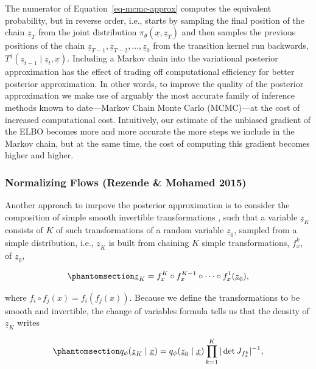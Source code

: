 \documentclass[
]{scrartcl}
\begin{document}
\begin{refsection}
The numerator of Equation~\ref{eq-mcmc-approx} computes the equivalent
probability, but in reverse order, i.e., starts by sampling the final
position of the chain \(\underline{z}_T\) from the joint distribution
\(π_\theta(\underline{x},
\underline{z}_T)\) and then samples the previous positions of the chain
\(\underline{z}_{T-1}, \underline{z}_{T-2}, \ldots, \underline{z}_0\)
from the transition kernel run backwards,
\(T^\dagger(\underline{z}_{t-1} \mid
\underline{z}_{t}, \underline{x})\). Including a Markov chain into the
variational posterior approximation has the effect of trading off
computational efficiency for better posterior approximation. In other
words, to improve the quality of the posterior approximation we make use
of arguably the most accurate family of inference methods known to
date---Markov Chain Monte Carlo (MCMC)---at the cost of increased
computational cost. Intuitively, our estimate of the unbiased gradient
of the ELBO becomes more and more accurate the more steps we include in
the Markov chain, but at the same time, the cost of computing this
gradient becomes higher and higher.

\subsubsection{Normalizing Flows (Rezende \& Mohamed
2015)}\label{sec-normalizing-flows}

Another approach to imrpove the posterior approximation is to consider
the composition of simple smooth invertible transformations
\autocite{rezende2016}, such that a variable \(\underline{z}_K\)
consists of \(K\) of such transformations of a random variable
\(\underline{z}_0\), sampled from a simple distribution, i.e.,
\(\underline{z}_K\) is built from chaining \(K\) simple transformations,
\(f_x^k\), of \(\underline{z}_0\),

\begin{equation}\phantomsection\label{eq-normalizing-flow}{
\underline{z}_K = 
f_x^K \circ f_x^{K-1} \circ \cdots \circ f_x^1(\underline{z}_0),
}\end{equation}

where \(f_i \circ f_j(x) = f_i(f_j(x))\). Because we define the
transformations to be smooth and invertible, the change of variables
formula tells us that the density of \(\underline{z}_K\) writes

\begin{equation}\phantomsection\label{eq-flow-density}{
q_\phi(\underline{z}_K \mid \underline{x}) = 
q_\phi(\underline{z}_0 \mid \underline{x}) \prod_{k=1}^K |\det J_{f_x^k}|^{-1},
}\end{equation}


\end{refsection}
\end{document}
